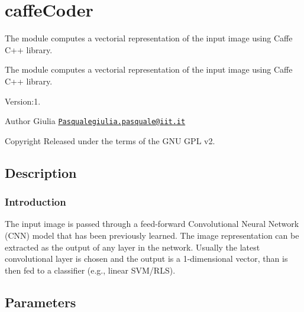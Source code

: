 \section{caffe\+Coder}
\label{group__caffeCoder}


The module computes a vectorial representation of the input image using Caffe C++ library.  


The module computes a vectorial representation of the input image using Caffe C++ library. 

Version\+:1. \begin{DoxyAuthor}{Author}
Giulia \href{mailto:Pasqualegiulia.pasquale@iit.it}{\tt Pasqualegiulia.\+pasquale@iit.\+it} ~\newline
 
\end{DoxyAuthor}
\begin{DoxyCopyright}{Copyright}
Released under the terms of the G\+NU G\+PL v2. 
\end{DoxyCopyright}
\hypertarget{group__caffeCoder_intro_sec}{}\subsection{Description}\label{group__caffeCoder_intro_sec}
\hypertarget{group__caffeCoder_sec-intro}{}\subsubsection{Introduction}\label{group__caffeCoder_sec-intro}
The input image is passed through a feed-\/forward Convolutional Neural Network (C\+NN) model that has been previously learned. The image representation can be extracted as the output of any layer in the network. Usually the latest convolutional layer is chosen and the output is a 1-\/dimensional vector, than is then fed to a classifier (e.\+g., linear S\+V\+M/\+R\+LS).\hypertarget{group__caffeCoder_parameters_sec}{}\subsection{Parameters}\label{group__caffeCoder_parameters_sec}

